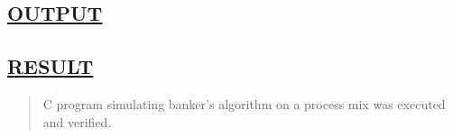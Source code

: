 \documentclass[a4paper, 12pt]{article}
\begin{document}
\subsection*{\underline{OUTPUT}}

\begin{figure}[H] 
    \centering
\end{figure}


\subsection*{\underline{RESULT}}
\begin{quote}
C program simulating banker’s algorithm on a process mix was executed and verified.
\end{quote}
\end{document}
